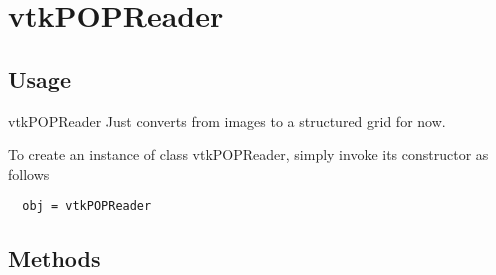 \section{vtkPOPReader}

\subsection{Usage}

 vtkPOPReader Just converts from images to a structured grid for now.

To create an instance of class vtkPOPReader, simply
invoke its constructor as follows
\begin{verbatim}
  obj = vtkPOPReader
\end{verbatim}
\subsection{Methods}

